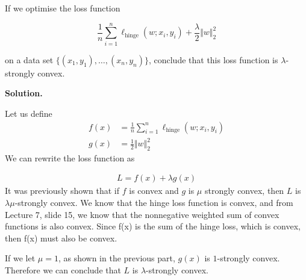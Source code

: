 \documentclass{exam}
\begin{document}
\begin{questions}
\begin{parts}
        \hr

        {
            If we optimise the loss function

            \begin{equation} \label{eq:2d-last}
                \frac{1}{n} \sum_{i = 1}^n \ell_{\text{hinge}}(w;x_i, y_i) + \frac{\lambda}{2} \Vert w \Vert_2^2
            \end{equation}

            on a data set $\{(x_1, y_1), \dots, (x_n, y_n)\}$, conclude that this loss function is $\lambda$-strongly convex.

            \textbf{Solution.}

            Let us define
            \begin{align*}
                f(x) & = \frac{1}{n}\sum_{i = 1}^n \ell_{\text{hinge}}(w; x_i, y_i) \\
                g(x) & = \frac{1}{2} \Vert w \Vert_2^2
            \end{align*}
            We can rewrite the loss function as

            \begin{align*}
                L = f(x) + \lambda g(x)
            \end{align*}
            It was previously shown that if $f$ is convex and $g$ is $\mu$ strongly convex, then $L$ is $\lambda\mu$-strongly convex. We know that the hinge loss function is convex, and from Lecture 7, slide 15, we know that the
            nonnegative weighted sum of convex functions is also convex. Since f(x) is the sum of the hinge loss, which is convex, then f(x) must also be convex.

            If we let $\mu = 1$, as shown in the previous part, $g(x)$ is $1$-strongly convex. Therefore we can conclude that $L$ is $\lambda$-strongly convex.
        }

        \hr

    \end{parts}

    \newpage
    \question
\end{questions}
\end{document}
